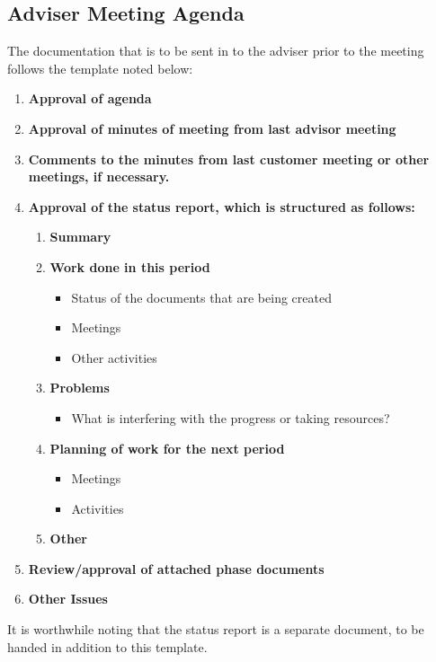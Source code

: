 \documentclass[../document]{subfiles}
\begin{document}
\subsection{Adviser Meeting Agenda}
The documentation that is to be sent in to the adviser prior to the meeting follows the template noted below:

\begin{enumerate}
	\item
	\textbf{Approval of agenda}
	\item
	\textbf{Approval of minutes of meeting from last advisor meeting}
	\item
	\textbf{Comments to the minutes from last customer meeting or other meetings, if necessary.}
	\item
	\textbf{Approval of the status report, which is structured as follows:}
	\begin{enumerate}[label*=\arabic*.]
		\item
		\textbf{Summary}
		\item
		\textbf{Work done in this period}
		\begin{itemize}
			\item
			Status of the documents that are being created
			\item
			Meetings
			\item
			Other activities
		\end{itemize}
		\item
		\textbf{Problems}
		\begin{itemize}
			\item
			What is interfering with the progress or taking resources?
		\end{itemize}
		\item
		\textbf{Planning of work for the next period}
		\begin{itemize}
			\item
			Meetings
			\item
			Activities
		\end{itemize}
		\item
		\textbf{Other}
	\end{enumerate}
	\item
	\textbf{Review/approval of attached phase documents}
	\item
	\textbf{Other Issues}
\end{enumerate}

It is worthwhile noting that the status report is a separate document, to be handed in addition to this template.

\newpage
\end{document}
